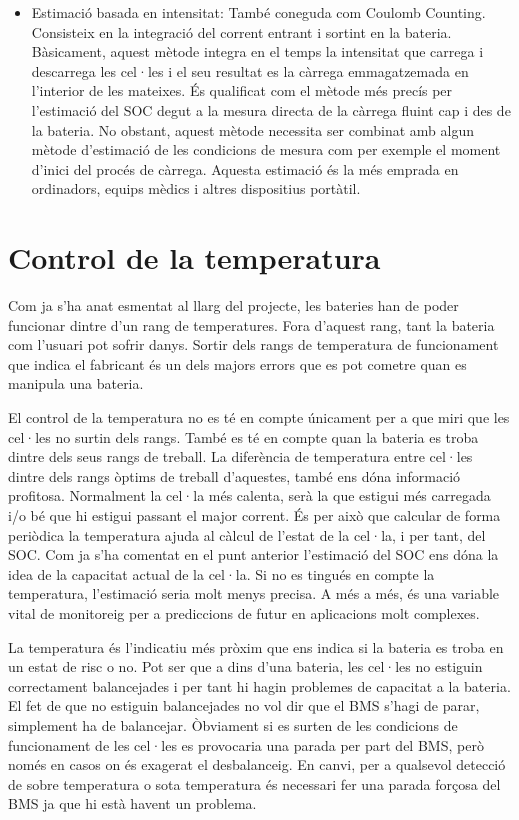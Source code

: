 \begin{itemize}
    \item Estimació basada en intensitat: També coneguda com Coulomb \newline Counting. Consisteix en la integració del corrent entrant i sortint en la bateria. Bàsicament, aquest mètode integra en el temps la intensitat que carrega i descarrega les cel·les i el seu resultat es la càrrega emmagatzemada en l'interior de les mateixes. És qualificat com el mètode més precís per l'estimació del SOC degut a la mesura directa de la càrrega fluint cap i des de la bateria. No obstant, aquest mètode necessita ser combinat amb algun mètode d'estimació de les condicions de mesura com per exemple el moment d'inici del procés de càrrega. Aquesta estimació és la més emprada en ordinadors, equips mèdics i altres dispositius portàtil.
\end{itemize}  

\section{Control de la temperatura}
Com ja s'ha anat esmentat al llarg del projecte, les bateries han de poder funcionar dintre d'un rang de temperatures. Fora d'aquest rang, tant la bateria com l'usuari pot sofrir danys. Sortir dels rangs de temperatura de funcionament que indica el fabricant és un dels majors errors que es pot cometre quan es manipula una bateria.

El control de la temperatura no es té en compte únicament per a que miri que les cel·les no surtin dels rangs. També es té en compte quan la bateria es troba dintre dels seus rangs de treball. La diferència de temperatura entre cel·les dintre dels rangs òptims de treball d'aquestes, també ens dóna informació profitosa. Normalment la cel·la més calenta, serà la que estigui més carregada i/o bé que hi estigui passant el major corrent. És per això que calcular de forma periòdica la temperatura ajuda al càlcul de l'estat de la cel·la, i per tant, del SOC. Com ja s'ha comentat en el punt anterior l'estimació del SOC ens dóna la idea de la capacitat actual de la cel·la. Si no es tingués en compte la temperatura, l'estimació seria molt menys precisa. A més a més, és una variable vital de monitoreig per a prediccions de futur en aplicacions molt complexes.

La temperatura és l'indicatiu més pròxim que ens indica si la bateria es troba en un estat de risc o no. Pot ser que a dins d'una bateria, les cel·les no estiguin correctament balancejades i per tant hi hagin problemes de capacitat a la bateria. El fet de que no estiguin balancejades no vol dir que el BMS s'hagi de parar, simplement ha de balancejar. Òbviament si es surten de les condicions de funcionament de les cel·les es provocaria una parada per part del BMS, però només en casos on és exagerat el desbalanceig. En canvi, per a qualsevol detecció de sobre temperatura o sota temperatura és necessari fer una parada forçosa del BMS ja que hi està havent un problema. 

